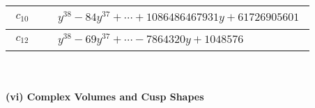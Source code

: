 \documentclass[1p]{elsarticle_modified}
\theoremstyle{definition}
\begin{document}
\begin{tabular}{m{50pt}|m{274pt}}
\hline $$\begin{aligned}c_{10}\end{aligned}$$&$\begin{aligned}
&y^{38}-84 y^{37}+\cdots+1086486467931 y+61726905601
\end{aligned}$\\
\hline $$\begin{aligned}c_{12}\end{aligned}$$&$\begin{aligned}
&y^{38}-69 y^{37}+\cdots-7864320 y+1048576
\end{aligned}$\\
\hline
\end{tabular}\\~\\
\newpage\flushleft \textbf{(vi) Complex Volumes and Cusp Shapes}
\end{document}
